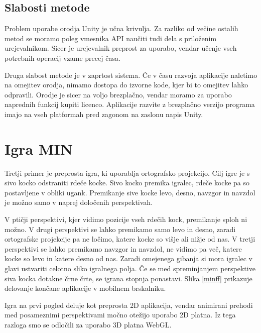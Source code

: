 \subsection{Slabosti metode}

Problem uporabe orodja Unity je učna krivulja. Za razliko od večine ostalih metod se moramo poleg vmesnika API naučiti tudi dela s priloženim urejevalnikom. Sicer je urejevalnik preprost za uporabo, vendar učenje vseh potrebnih operacij vzame precej časa.

Druga slabost metode je v zaprtost sistema. Če v času razvoja aplikacije naletimo na omejitev orodja, nimamo dostopa do izvorne kode, kjer bi to omejitev lahko odpravili. Orodje je sicer na voljo brezplačno, vendar moramo za uporabo naprednih funkcij kupiti licenco. Aplikacije razvite z brezplačno verzijo programa imajo na vseh platformah pred zagonom na zaslonu napis Unity. 

\section{Igra MIN}

Tretji primer je preprosta igra, ki uporablja ortografsko projekcijo. Cilj igre je s sivo kocko odstraniti rdeče kocke. Sivo kocko premika igralec, rdeče kocke pa so postavljene v obliki ugank. Premikanje sive kocke levo, desno, navzgor in navzdol je možno samo v naprej določenih perspektivah. 

V ptičji perspektivi, kjer vidimo pozicije vseh rdečih kock, premikanje sploh ni možno. V drugi perspektivi se lahko premikamo samo levo in desno, zaradi ortografske projekcije pa ne ločimo, katere kocke so višje ali nižje od nas. V tretji perspektivi se lahko premikamo navzgor in navzdol, ne vidimo pa več, katere kocke so levo in katere desno od nas. Zaradi omejenega gibanja si mora igralec v glavi ustvariti celotno sliko igralnega polja. Če se med spreminjanjem perspektive siva kocka dotakne črne črte, se igrana stopnja ponastavi. Slika \ref{minff} prikazuje delovanje končane aplikacije v mobilnem brskalniku.

Igra na prvi pogled deluje kot preprosta 2D aplikacija, vendar animirani prehodi med posameznimi perspektivami močno otežijo uporabo 2D platna. Iz tega razloga smo se odločili za uporabo 3D platna WebGL. %

